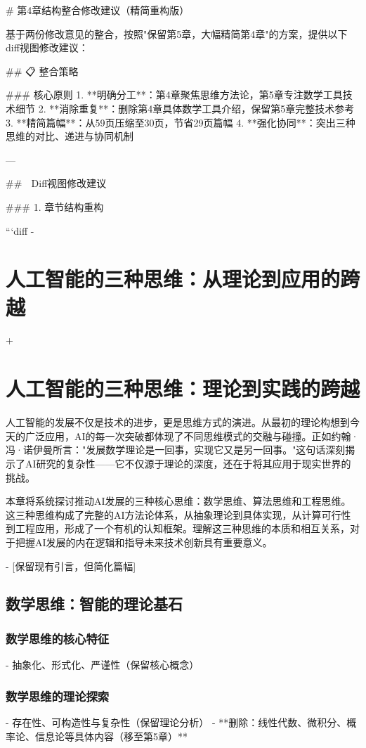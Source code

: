 # 第4章结构整合修改建议（精简重构版）

基于两份修改意见的整合，按照"保留第5章，大幅精简第4章"的方案，提供以下diff视图修改建议：

## 📋 整合策略

### 核心原则
1. **明确分工**：第4章聚焦思维方法论，第5章专注数学工具技术细节
2. **消除重复**：删除第4章具体数学工具介绍，保留第5章完整技术参考
3. **精简篇幅**：从59页压缩至30页，节省29页篇幅
4. **强化协同**：突出三种思维的对比、递进与协同机制

---

## 🔧 Diff视图修改建议

### 1. 章节结构重构

```diff
- \chapter{人工智能的三种思维：从理论到应用的跨越}
+ \chapter{人工智能的三种思维：理论到实践的跨越}

人工智能的发展不仅是技术的进步，更是思维方式的演进。从最初的理论构想到今天的广泛应用，AI的每一次突破都体现了不同思维模式的交融与碰撞。正如约翰·冯·诺伊曼所言："发展数学理论是一回事，实现它又是另一回事。"这句话深刻揭示了AI研究的复杂性——它不仅源于理论的深度，还在于将其应用于现实世界的挑战。

本章将系统探讨推动AI发展的三种核心思维：数学思维、算法思维和工程思维。这三种思维构成了完整的AI方法论体系，从抽象理论到具体实现，从计算可行性到工程应用，形成了一个有机的认知框架。理解这三种思维的本质和相互关系，对于把握AI发展的内在逻辑和指导未来技术创新具有重要意义。

- [保留现有引言，但简化篇幅]

\section{数学思维：智能的理论基石} %
\subsection{数学思维的核心特征}
  - 抽象化、形式化、严谨性（保留核心概念）
\subsection{数学思维的理论探索}
  - 存在性、可构造性与复杂性（保留理论分析）
  - **删除：线性代数、微积分、概率论、信息论等具体内容（移至第5章）**

